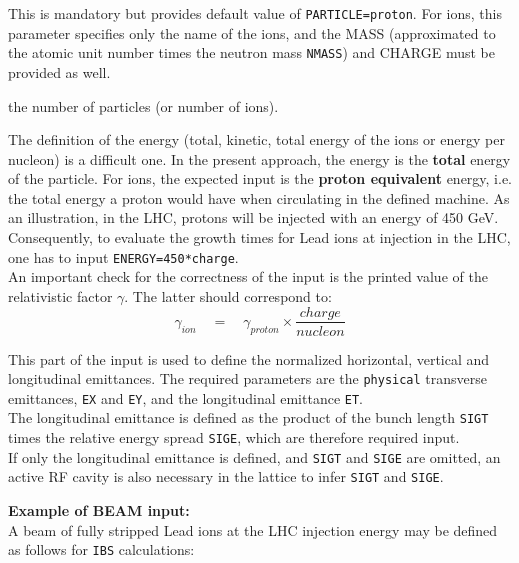 \begin{madlist}
   This is mandatory but \madx provides default
  value of \texttt{PARTICLE=proton}. For ions, this parameter specifies
  only the name of the ions, and the MASS (approximated to the atomic
  unit number times the neutron mass \texttt{NMASS}) and CHARGE must be
  provided as well.

   the number of particles (or number of ions).

   The definition of the energy (total, kinetic, total
  energy of the ions or energy per nucleon) is a difficult one. In the
  present approach, the energy is the \textbf{total} energy of the
  particle. For ions, the expected input is the \textbf{proton
    equivalent} energy, i.e. the total energy a proton would have when
  circulating in the defined machine. As an illustration, in the LHC,
  protons will be injected with an energy of 450 GeV. Consequently, to
  evaluate the growth times for Lead ions at injection in the LHC, one
  has to input \texttt{ENERGY=450*charge}. \\
  An important check for the correctness of the input is the printed value
  of the relativistic factor  $\gamma$. The latter should correspond to:   
  \[
  \gamma_{ion} \quad = \quad \gamma_{proton} \times \frac{charge}{nucleon}
  \]

   This part of the input is used to define the
  normalized horizontal, vertical and longitudinal emittances. 
  The required parameters are the \texttt{physical} transverse
  emittances, \texttt{EX} and \texttt{EY}, and the longitudinal
  emittance \texttt{ET}.\\  
  The longitudinal emittance is defined  as the product of the bunch
  length \texttt{SIGT} times the relative energy spread \texttt{SIGE},
  which are therefore required input. \\  
  If only the longitudinal emittance is defined, and \texttt{SIGT}
  and \texttt{SIGE} are omitted, an active RF cavity is also
  necessary in the lattice to infer \texttt{SIGT} and \texttt{SIGE}.

\end{madlist}


{\bf Example of BEAM input:}\\
A beam of fully stripped Lead ions at the LHC injection energy may be
defined as follows for \texttt{IBS} calculations: 


